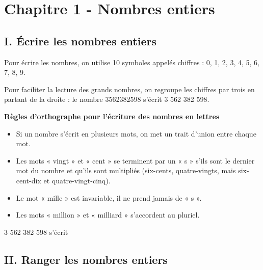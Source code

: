 

\section*{Chapitre 1 - Nombres entiers}


\subsection*{I. Écrire les nombres entiers}

\begin{Définition*}
Pour écrire les nombres, on utilise 10 symboles appelés chiffres : 0, 1, 2, 3, 4, 5, 6, 7, 8, 9.
\end{Définition*}


\begin{Remarque}
Pour faciliter la lecture des grands nombres, on regroupe les chiffres par trois en partant de la droite : 
le nombre 3562382598 s'écrit 3 562 382 598.
\end{Remarque}


\textbf{Règles d'orthographe pour l'écriture des nombres en lettres}

\begin{itemize}
\item Si un nombre s'écrit en plusieurs mots, on met un trait d'union entre chaque mot.
\item Les mots « vingt » et « cent » se terminent par un « s » s'ils sont le dernier mot du nombre et qu'ils sont multipliés (six-cents, quatre-vingts, mais six-cent-dix et quatre-vingt-cinq).
\item Le mot « mille » est invariable, il ne prend jamais de « s ».
\item Les mots « million » et « milliard » s'accordent au pluriel.
\end{itemize}



\begin{Exemple}
3 562 382 598 s'écrit \ligne

\ligne

\vspace{-0.2cm}
\end{Exemple}

\vspace{-0.2cm}
\subsection*{II. Ranger les nombres entiers}



